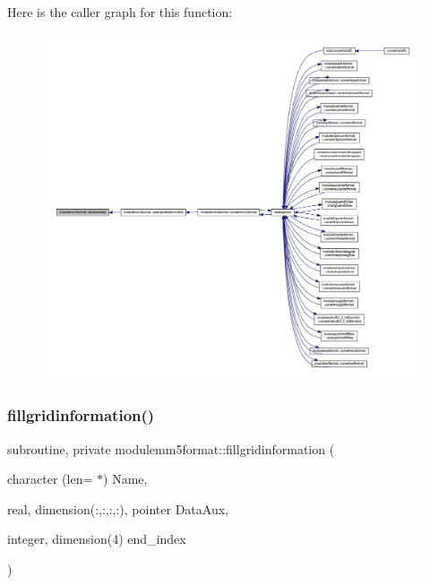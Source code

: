 Here is the caller graph for this function\+:\nopagebreak
\begin{figure}[H]
\begin{center}
\leavevmode
\includegraphics[width=350pt]{namespacemodulemm5format_a0fb6edd1ddbebdd980a7396df7323e1a_icgraph}
\end{center}
\end{figure}
\mbox{\label{namespacemodulemm5format_a2871229a63fac4ca43cec154d7ed93d4}} 
\subsubsection{\texorpdfstring{fillgridinformation()}{fillgridinformation()}}
{\footnotesize\ttfamily subroutine, private modulemm5format\+::fillgridinformation (\begin{DoxyParamCaption}\item[{character (len= $\ast$)}]{Name,  }\item[{real, dimension(\+:,\+:,\+:,\+:), pointer}]{Data\+Aux,  }\item[{integer, dimension(4)}]{end\+\_\+index }\end{DoxyParamCaption})\hspace{0.3cm}{\ttfamily [private]}}


